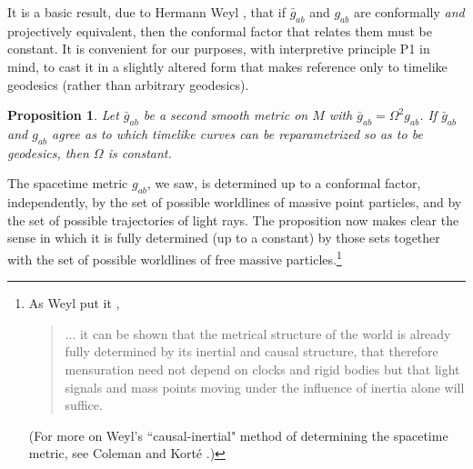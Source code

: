 \documentclass [12] {article}
\theoremstyle{plain}
\newtheorem{proposition}{Proposition}[subsection]
\numberwithin{figure}{subsection}
\numberwithin{proposition}{subsection}
\begin{document}
It is a basic result, due to Hermann Weyl ,
that if  $\bar{g}_{ab}$ and $g_{ab}$  are conformally \emph{and} projectively equivalent, then the conformal factor that relates them must be constant. It is convenient for our purposes, with interpretive principle P1 in mind, to cast it in a slightly altered form that makes reference only to timelike geodesics (rather than arbitrary geodesics).%
\begin{proposition} \label{projective structure}  
Let $\bar{g}_{ab}$ be a second smooth metric on $M$ with $\bar{g}_{ab} = \Omega^2 g_{ab}$. If $\bar{g}_{ab}$ and $g_{ab}$ agree as to which timelike curves can be reparametrized so as to be geodesics, then $\Omega$ is constant.    
\end{proposition}
%
The spacetime metric $g_{ab}$, we saw, is determined  up to a conformal factor, independently, by the set of possible worldlines of massive point particles, and by the  set of possible trajectories of light rays.  The proposition now makes clear the sense in which  it is fully determined (up to a constant) by those sets together with the set of possible worldlines of free massive particles.\footnote{As Weyl put it  ,
\begin {quote}
... it can be shown that the metrical structure of the world is already fully determined by its inertial and causal structure, that therefore mensuration need not depend on clocks and rigid bodies but that light signals and mass points moving under the influence of inertia alone will suffice.  
\end{quote}    
(For more on Weyl's  ``causal-inertial" method of determining the spacetime metric,  see Coleman and Kort\'e .)}  
\end{document}
